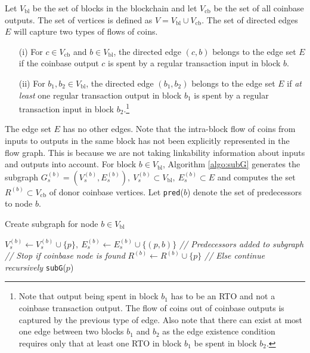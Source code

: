 Let $V_{\text{bl}}$ be the set of blocks in the blockchain and let $V_{\text{cb}}$ be the set of all coinbase outputs. %
The set of vertices is defined as $V = V_{\text{bl}} \cup V_{\text{cb}}$. 
The set of directed edges $E$ will capture two types of flows of coins.
\begin{enumerate}
  \item[(i)] For $c \in V_{\text{cb}}$ and $b \in V_{\text{bl}}$, the directed edge $(c, b)$ belongs to the edge set $E$ if the coinbase output $c$ is spent by a regular transaction input in block $b$.
  \item[(ii)] For $b_1, b_2 \in V_{\text{bl}}$, the directed edge $(b_1, b_2)$ belongs to the edge set $E$ if \textit{at least} one regular transaction output in block $b_1$ is spent by a regular transaction input in block $b_2$.\footnote{Note that output being spent in block $b_1$ has to be an RTO and not a coinbase transaction output. The flow of coins out of coinbase outputs is captured by the previous type of edge. Also note that there can exist at most one edge between two blocks $b_1$ and $b_2$ as the edge existence condition requires only that at least one RTO in block $b_1$ be spent in block $b_2$.}
\end{enumerate}
The edge set $E$ has no other edges.
Note that the intra-block flow of coins from inputs to outputs in the same block has not been explicitly represented in the flow graph. This is because we are not taking linkability information about inputs and outputs into account.
For block $b \in V_{\text{bl}}$, Algorithm \ref{algo:subG} generates the subgraph $G_s^{(b)} = (V_s^{(b)}, E_s^{(b)}), \ V_s^{(b)} \subset V_{\text{bl}}, \ E_s^{(b)} \subset E$ and computes the set $R^{(b)} \subset V_{\text{cb}}$ of donor coinbase vertices.
Let \texttt{pred}($b$) denote the set of predecessors to node $b$.
\begin{algorithm}[h]
	\caption{Create subgraph for node $b \in V_{\text{bl}}$} 
 \begin{algorithmic}[1]
     \State $V_s^{(b)} \leftarrow V_s^{(b)} \cup \{p\}, \ E_s^{(b)} \leftarrow E_s^{(b)} \cup \{(p, b)\} $ \hfill{\footnotesize \textit{// Predecessors added to subgraph}}
      \hfill{\footnotesize \textit{// Stop if coinbase node is found}}
       \State $R^{(b)} \leftarrow R^{(b)} \cup \{p\}$
     \Else \hfill{\footnotesize \textit{// Else continue recursively}}
     \State \texttt{subG}($p$)
     \EndIf
   \EndFor
   \EndProcedure
 \end{algorithmic} 
 \label{algo:subG}
\end{algorithm}

